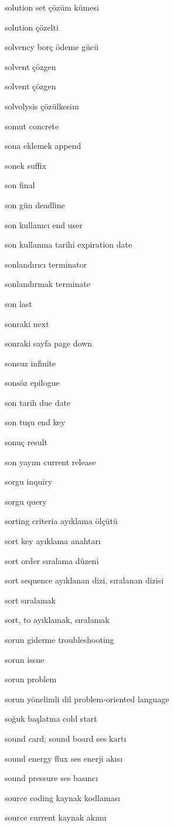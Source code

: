 \documentclass[12pt,fleqn]{article}\usepackage{../../common}
\begin{document}
solution set çözüm kümesi

solution çözelti

solvency borç ödeme gücü

solvent çözgen

solvent çözgen

solvolysis çözülkesim

somut concrete

sona eklemek append

sonek suffix

son final

son gün deadline

son kullanıcı end user

son kullanma tarihi expiration date

sonlandırıcı terminator

sonlandırmak terminate

son last

sonraki next

sonraki sayfa page down

sonsuz infinite

sonsöz epilogue

son tarih due date

son tuşu end key

sonuç result

son yayım current release

sorgu inquiry

sorgu query

sorting criteria ayıklama ölçütü

sort key ayıklama anahtarı

sort order sıralama düzeni

sort sequence ayıklanan dizi, sıralanan dizisi

sort sıralamak

sort, to ayıklamak, sıralamak

sorun giderme troubleshooting

sorun issue

sorun problem

sorun yönelimli dil problem-oriented language

soğuk başlatma cold start

sound card; sound board ses kartı

sound energy flux ses enerji akısı

sound pressure ses basıncı

source coding kaynak kodlaması

source current kaynak akımı
\end{document}
